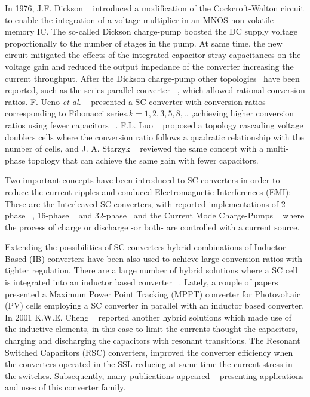 In 1976, J.F. Dickson ~\cite{76Dickson} introduced a modification of the Cockcroft-Walton circuit to enable the
integration of a voltage multiplier in an MNOS non volatile memory IC. The so-called Dickson charge-pump boosted
the DC supply voltage proportionally to the number of stages in the pump. At same time, the new circuit mitigated the effects
of the integrated capacitor stray capacitances on the voltage gain and reduced the output impedance
of the converter increasing the current throughput. After the Dickson charge-pump other topologies~\cite{09Seeman} have been reported, such as the series-parallel converter ~\cite{94Ngo,94Cheong}, which allowed rational conversion ratios. F. Ueno \textit{et al.} ~\cite{91Ueno} presented a SC converter with conversion ratios corresponding to Fibonacci series,$k=1,2,3,5,8,..$ ,achieving higher conversion ratios using fewer capacitors ~\cite{95Makowski,09Allasasmeh}.  F.L. Luo  ~\cite{02Luo}
proposed a topology cascading voltage doublers cells where the conversion ratio follows a quadratic relationship with the number
 of cells, and J. A. Starzyk ~\cite{01Starzyk} reviewed the same concept with a multi-phase topology that can achieve the same gain with fewer capacitors.

Two important concepts have been introduced to SC converters in order to reduce the current ripples and conduced Electromagnetic Interferences (EMI): These are the Interleaved SC converters, with reported implementations of 2-phase ~\cite{07Chang,99Chung}, 16-phase ~\cite{09Breussegem} and 32-phase~\cite{10Le} and the Current Mode Charge-Pumps ~\cite{96Zhu,09Das} where the process of charge or discharge -or both- are controlled with a current source.

Extending the possibilities of SC converters hybrid combinations of Inductor-Based (IB) converters have been also used to achieve large
conversion ratios with tighter regulation. There are a large number of hybrid solutions where a SC cell is integrated into an inductor
based converter ~\cite{05Axelrod,08Axelrod, 11Mayo,11Miranda,12Kline}. Lately, a couple of papers ~\cite{12Zhigang,11Dazhong} presented a
Maximum Power Point Tracking (MPPT) converter for Photovoltaic (PV) cells employing a SC converter in parallel with an inductor based converter.
In 2001 K.W.E. Cheng ~\cite{01Cheng} reported another hybrid solutions which made use of the inductive elements, in this case to limit the
currents thought the capacitors, charging and discharging the capacitors with resonant transitions. The Resonant Switched Capacitors (RSC) converters,
improved the converter efficiency when the converters operated in the SSL reducing at same time the current stress in the switches. Subsequently, many publications appeared ~\cite{05Lee,10Cao,11Gebben,07Shoyama} presenting applications and uses of this converter family.



